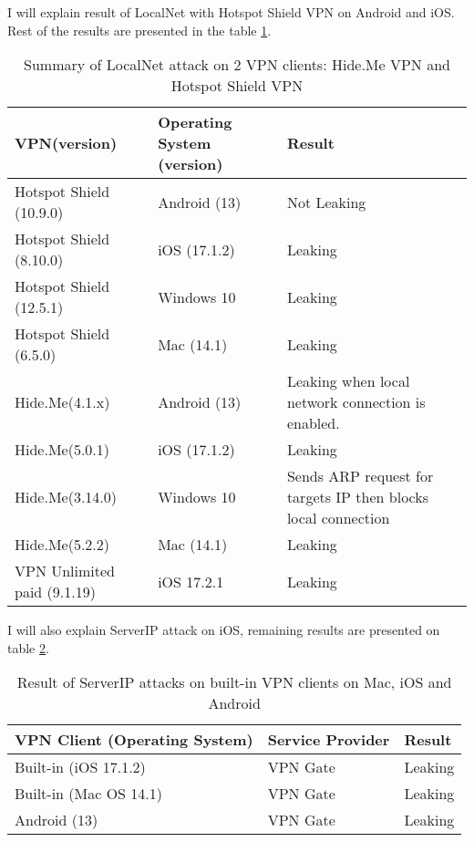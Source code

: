 \documentclass[letterpaper,11pt]{article}
\begin{document}
I will explain result of LocalNet with Hotspot Shield VPN on Android and iOS. Rest of the results are presented in the table \ref{tab:local-net-summary}. 
\begin{table}[h]
    \centering
    \begin{tabular}{|p{40mm}|p{30mm}|p{75mm}|}
    \hline
    VPN(version) & Operating System  (version) & Result\\
     \hline
     \hline
     \hline
    Hotspot Shield (10.9.0) & Android (13)  & Not Leaking \\
    \hline
    Hotspot Shield (8.10.0) & iOS (17.1.2) & Leaking \\
    \hline
    Hotspot Shield (12.5.1) & Windows 10  &  Leaking \\
    \hline
    Hotspot Shield (6.5.0) & Mac (14.1) & Leaking \\
    \hline
    \hline
     Hide.Me(4.1.x) & Android (13)  & Leaking when local network connection is enabled. \\
     \hline
    Hide.Me(5.0.1) & iOS (17.1.2) & Leaking \\
    \hline
     Hide.Me(3.14.0) & Windows 10  &  Sends ARP request for targets IP then blocks local connection \\
    \hline
    Hide.Me(5.2.2) & Mac (14.1) & Leaking \\
    \hline
    \hline
    VPN Unlimited paid (9.1.19) & iOS 17.2.1 & Leaking \\
    \hline
    \end{tabular}
    \caption{Summary of LocalNet attack on 2 VPN clients: Hide.Me VPN and Hotspot Shield VPN }
    \label{tab:local-net-summary}
\end{table}
I will also explain ServerIP attack on iOS, remaining results are presented on table \ref{tab:server-ip-summary}.
\begin{table}
	\centering
	\begin{tabular}{|p{60mm}|p{40mm}|p{50mm}|}
		\hline
		VPN Client (Operating System) & Service Provider & Result \\
		\hline
		\hline
		\hline
		Built-in (iOS 17.1.2) & VPN Gate & Leaking \\
		\hline
		Built-in (Mac OS 14.1) & VPN Gate & Leaking \\
		\hline
		Android (13) & VPN Gate & Leaking \\
		\hline
	\end{tabular}
	\caption{Result of ServerIP attacks on built-in VPN clients on Mac, iOS and Android}
	\label{tab:server-ip-summary}
\end{table}
\end{document}
